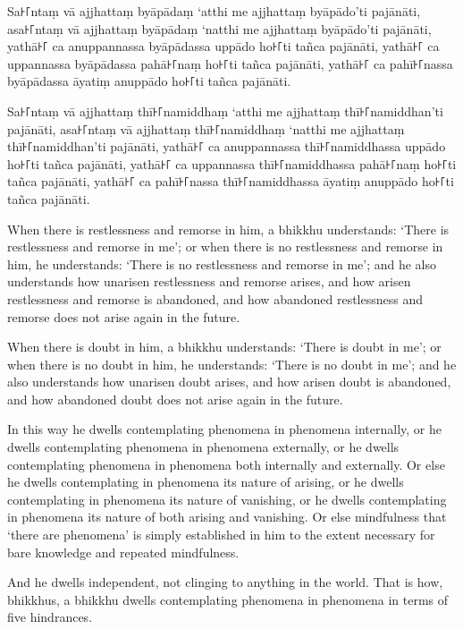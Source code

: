 Sa꜔꜒ntaṃ vā ajjhattaṃ byāpādaṃ ‘atthi me ajjhattaṃ byāpādo’ti pajānāti,
asa꜔꜒ntaṃ vā ajjhattaṃ byāpādaṃ ‘natthi me ajjhattaṃ byāpādo’ti pajānāti,
yathā꜔꜒ ca anuppannassa byāpādassa uppādo ho꜔꜒ti tañca pajānāti,
yathā꜔꜒ ca uppannassa byāpādassa pahā꜔꜒naṃ ho꜔꜒ti tañca pajānāti,
yathā꜔꜒ ca pahī꜔꜒nassa byāpādassa āyatiṃ anuppādo ho꜔꜒ti tañca pajānāti.

\enlargethispage{\baselineskip}

Sa꜔꜒ntaṃ vā ajjhattaṃ thī꜔꜒namiddhaṃ ‘atthi me ajjhattaṃ thī꜔꜒namiddhan’ti pajānāti,
asa꜔꜒ntaṃ vā ajjhattaṃ thī꜔꜒namiddhaṃ ‘natthi me ajjhattaṃ thī꜔꜒namiddhan’ti pajānāti,
yathā꜔꜒ ca anuppannassa thī꜔꜒namiddhassa uppādo ho꜔꜒ti tañca pajānāti,
yathā꜔꜒ ca uppannassa thī꜔꜒namiddhassa pahā꜔꜒naṃ ho꜔꜒ti tañca pajānāti,
yathā꜔꜒ ca pahī꜔꜒nassa thī꜔꜒namiddhassa āyatiṃ anuppādo ho꜔꜒ti tañca pajānāti.

\englishPage

When there is restlessness and remorse in him, a bhikkhu understands:
`There is restlessness and remorse in me';
or when there is no restlessness and remorse in him, he understands:
`There is no restlessness and remorse in me';
and he also understands how unarisen restlessness and remorse arises,
and how arisen restlessness and remorse is abandoned,
and how abandoned restlessness and remorse does not arise again in the future.

When there is doubt in him, a bhikkhu understands:
`There is doubt in me';
or when there is no doubt in him, he understands:
`There is no doubt in me';
and he also understands how unarisen doubt arises,
and how arisen doubt is abandoned,
and how abandoned doubt does not arise again in the future.

In this way he dwells contemplating phenomena in phenomena internally, or he
dwells contemplating phenomena in phenomena externally, or he dwells
contemplating phenomena in phenomena both internally and externally. Or else he
dwells contemplating in phenomena its nature of arising, or he dwells
contemplating in phenomena its nature of vanishing, or he dwells contemplating
in phenomena its nature of both arising and vanishing. Or else mindfulness that
‘there are phenomena’ is simply established in him to the extent necessary for
bare knowledge and repeated mindfulness.

And he dwells independent, not clinging to anything in the world. That is how,
bhikkhus, a bhikkhu dwells contemplating phenomena in phenomena in terms of five
hindrances.


